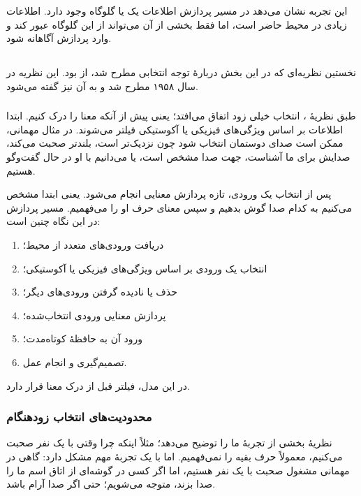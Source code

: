 این تجربه نشان می‌دهد در مسیر پردازش اطلاعات یک  یا گلوگاه وجود دارد. اطلاعات زیادی در محیط حاضر است، اما فقط بخشی از آن می‌تواند از این گلوگاه عبور کند و وارد پردازش آگاهانه شود.

\subsection{}
نخستین نظریه‌ای که در این بخش دربارهٔ توجه انتخابی مطرح شد،  از  بود. این نظریه در سال ۱۹۵۸ مطرح شد و به آن  نیز گفته می‌شود.

\subsubsection{}
طبق نظریهٔ ، انتخاب خیلی زود اتفاق می‌افتد؛ یعنی پیش از آنکه معنا را درک کنیم. ابتدا اطلاعات بر اساس ویژگی‌های فیزیکی یا آکوستیکی فیلتر می‌شوند. در مثال مهمانی، ممکن است صدای دوستمان انتخاب شود چون نزدیک‌تر است، بلندتر صحبت می‌کند، صدایش برای ما آشناست، جهت صدا مشخص است، یا می‌دانیم با او در حال گفت‌وگو هستیم.

پس از انتخاب یک ورودی، تازه پردازش معنایی انجام می‌شود. یعنی ابتدا مشخص می‌کنیم به کدام صدا گوش بدهیم و سپس معنای حرف او را می‌فهمیم. مسیر پردازش در این نگاه چنین است:
\begin{enumerate}
    \item دریافت ورودی‌های متعدد از محیط؛
    \item انتخاب یک ورودی بر اساس ویژگی‌های فیزیکی یا آکوستیکی؛
    \item حذف یا نادیده گرفتن ورودی‌های دیگر؛
    \item پردازش معنایی ورودی انتخاب‌شده؛
    \item ورود آن به حافظهٔ کوتاه‌مدت؛
    \item تصمیم‌گیری و انجام عمل.
\end{enumerate}

در این مدل، فیلتر قبل از درک معنا قرار دارد.

\subsubsection{محدودیت‌های انتخاب زودهنگام}
نظریهٔ  بخشی از تجربهٔ ما را توضیح می‌دهد؛ مثلاً اینکه چرا وقتی با یک نفر صحبت می‌کنیم، معمولاً حرف بقیه را نمی‌فهمیم. اما با یک تجربهٔ مهم مشکل دارد: گاهی در مهمانی مشغول صحبت با یک نفر هستیم، اما اگر کسی در گوشه‌ای از اتاق اسم ما را صدا بزند، متوجه می‌شویم؛ حتی اگر صدا آرام باشد.


